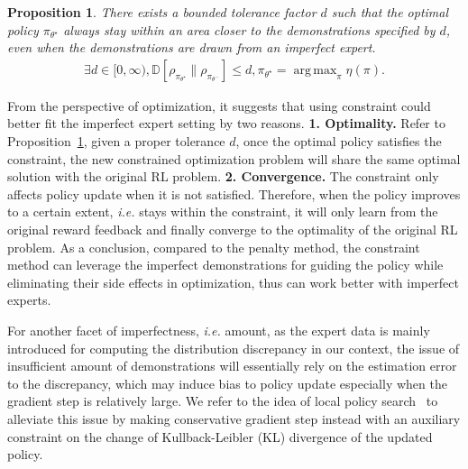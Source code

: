 \documentclass[letterpaper]{article} %
\newtheorem{proposition}{Proposition}
\DeclareMathOperator*{\argmax}{arg\,max}
\begin{document}
\begin{proposition}\label{prop:3}
There exists a bounded tolerance factor $d$ such that the optimal policy $\pi_{\theta^\star}$ always stay within an area closer to the demonstrations specified by $d$, even when the demonstrations are drawn from an imperfect expert.
\begin{align}
        \exists d\in [0, \infty), \mathbb{D}\left[\rho_{\pi_{\theta^\star}}\|\rho_{\pi_{\theta^-}}\right] \leqslant d, \pi_{\theta^\star} = \argmax_\pi \eta(\pi) \text{.}\nonumber
\end{align}
\end{proposition}
From the perspective of optimization, it suggests that using constraint could better fit the imperfect expert setting by two reasons. \textbf{1. Optimality.} Refer to Proposition~\ref{prop:3},
given a proper tolerance $d$, once the optimal policy satisfies the constraint, the new constrained optimization problem will share the same optimal solution with the original RL problem. \textbf{2. Convergence.} The constraint only affects policy update when it is not satisfied. Therefore, when the policy improves to a certain extent, \emph{i.e.} stays within the constraint, it will only learn from the original reward feedback and finally converge to the optimality of the original RL problem.
As a conclusion, compared to the penalty method, the constraint method can leverage the imperfect demonstrations for guiding the policy while eliminating their side effects in optimization, thus can work better with imperfect experts.

For another facet of imperfectness, \emph{i.e.} amount, as the expert data is mainly introduced for computing the distribution discrepancy in our context, the issue of insufficient amount of demonstrations will essentially rely on the estimation error to the discrepancy, which may induce bias to policy update especially when the gradient step is relatively large. We refer to the idea of local policy search~\cite{lps,lps2} to alleviate this issue by making conservative gradient step instead with an auxiliary constraint on the change of Kullback-Leibler (KL) divergence of the updated policy.
\end{document}

